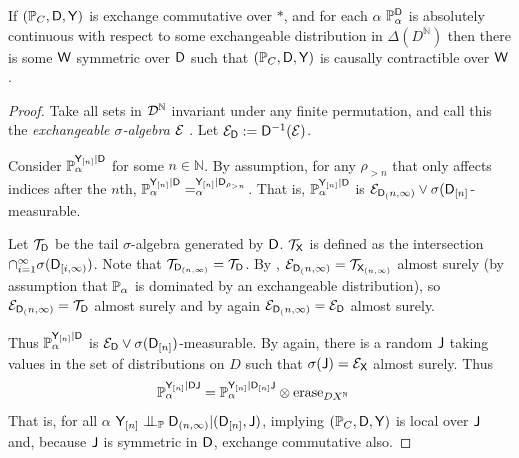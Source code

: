 \begin{theorem}\label{lem:exch_prod_ciid}
If $(\mathbb{P}_C,\mathsf{D},\mathsf{Y})$ is exchange commutative over $*$, and for each $\alpha$ $\mathbb{P}_\alpha^{\mathsf{D}}$ is absolutely continuous with respect to some exchangeable distribution in $\Delta(D^{\mathbb{N}})$ then there is some $\mathsf{W}$ symmetric over $\mathsf{D}$ such that $(\mathbb{P}_C,\mathsf{D},\mathsf{Y})$ is causally contractible over $\mathsf{W}$.
\end{theorem}

\begin{proof}
Take all sets in $\mathcal{D}^{\mathbb{N}}$ invariant under any finite permutation, and call this the \emph{exchangeable $\sigma$-algebra} $\mathcal{E}$ \citep[pg. 29]{kallenberg_basic_2005}. Let $\mathcal{E}_{\mathsf{D}}:=\mathsf{D}^{-1}(\mathcal{E})$.

Consider $\mathbb{P}_\alpha^{\mathsf{Y}_{[n]}|\mathsf{D}}$ for some $n\in \mathbb{N}$. By assumption, for any $\rho_{>n}$ that only affects indices after the $n$th, $\mathbb{P}_\alpha^{\mathsf{Y}_{[n]}|\mathsf{D}}=_\alpha^{\mathsf{Y}_{[n]}|\mathsf{D}_{\rho_{>n}}}$. That is, $\mathbb{P}_\alpha^{\mathsf{Y}_{[n]}|\mathsf{D}}$ is $\mathcal{E}_{\mathsf{D}_(n,\infty)}\vee\sigma(\mathsf{D}_{[n]}$-measurable.

Let $\mathcal{T}_{\mathsf{D}}$ be the tail $\sigma$-algebra generated by $\mathsf{D}$. $\mathcal{T}_{\mathsf{X}}$ is defined as the intersection $\cap_{i=1}^{\infty} \sigma(\mathsf{D}_{[i,\infty)})$. Note that $\mathcal{T}_{\mathsf{D}_{(n,\infty)}}=\mathcal{T}_{\mathsf{D}}$. By \citet[Corollary 1.6]{kallenberg_basic_2005}, $\mathcal{E}_{\mathsf{D}_(n,\infty)}=\mathcal{T}_{\mathsf{X}_{(n,\infty)}}$ almost surely (by assumption that $\mathbb{P}_\alpha$ is dominated by an exchangeable distribution), so $\mathcal{E}_{\mathsf{D}_(n,\infty)}=\mathcal{T}_{\mathsf{D}}$ almost surely and by \citet[Corollary 1.6]{kallenberg_basic_2005} again $\mathcal{E}_{\mathsf{D}_(n,\infty)}=\mathcal{E}_{\mathsf{D}}$ almost surely.

Thus $\mathbb{P}_\alpha^{\mathsf{Y}_{[n]}|\mathsf{D}}$ is $\mathcal{E}_{\mathsf{D}}\vee\sigma(\mathsf{D}_{[n]})$-measurable. By \citet[Corollary 1.6]{kallenberg_basic_2005} again, there is a random $\mathsf{J}$ taking values in the set of distributions on $D$ such that $\sigma(\mathsf{J})=\mathcal{E}_{\mathsf{X}}$ almost surely. Thus
\begin{align}
    \mathbb{P}_\alpha^{\mathsf{Y}_{[n]}|\mathsf{D}\mathsf{J}} &= \mathbb{P}_\alpha^{\mathsf{Y}_{[n]}|\mathsf{D}_{[n]}\mathsf{J}}\otimes \text{erase}_{DX^{\mathbb{N}}}
\end{align}
That is, for all $\alpha$ $\RV{Y}_{[n]}\CI_{\prob{P}} \RV{D}_{(n,\infty)}|(\RV{D}_{[n]},\RV{J})$, implying $(\mathbb{P}_C,\mathsf{D},\mathsf{Y})$ is local over $\mathsf{J}$ and, because $\mathsf{J}$ is symmetric in $\mathsf{D}$, exchange commutative also.
\end{proof}

